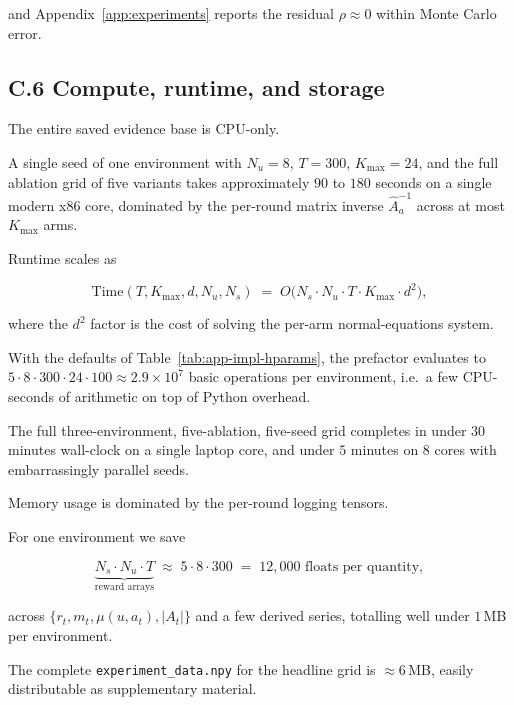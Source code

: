 \documentclass{article} %
\begin{document}
and Appendix~\ref{app:experiments} reports the residual $\rho \approx 0$ within Monte Carlo error.

\subsection{C.6 Compute, runtime, and storage}

\label{app:impl-compute}

The entire saved evidence base is CPU-only.

A single seed of one environment with $N_u = 8$, $T = 300$, $K_{\max} = 24$, and the full ablation grid of five variants takes approximately $90$ to $180$ seconds on a single modern x86 core, dominated by the per-round matrix inverse $\widehat{A}_a^{-1}$ across at most $K_{\max}$ arms.

Runtime scales as

\begin{equation}
\label{eq:app-impl-runtime}
\mathrm{Time}(T, K_{\max}, d, N_u, N_s) \;=\; O\big(N_s \cdot N_u \cdot T \cdot K_{\max} \cdot d^2\big),
\end{equation}

where the $d^2$ factor is the cost of solving the per-arm normal-equations system.

With the defaults of Table~\ref{tab:app-impl-hparams}, the prefactor evaluates to $5 \cdot 8 \cdot 300 \cdot 24 \cdot 100 \approx 2.9 \times 10^7$ basic operations per environment, i.e.\ a few CPU-seconds of arithmetic on top of Python overhead.

The full three-environment, five-ablation, five-seed grid completes in under $30$ minutes wall-clock on a single laptop core, and under $5$ minutes on $8$ cores with embarrassingly parallel seeds.

Memory usage is dominated by the per-round logging tensors.

For one environment we save

\begin{equation}
\label{eq:app-impl-storage}
\underbrace{N_s \cdot N_u \cdot T}_{\text{reward arrays}} \;\approx\; 5 \cdot 8 \cdot 300 \;=\; 12{,}000 \text{ floats per quantity},
\end{equation}

across $\{r_t, m_t, \mu(u,a_t), |A_t|\}$ and a few derived series, totalling well under $1$\,MB per environment.

The complete \texttt{experiment\_data.npy} for the headline grid is $\approx 6$\,MB, easily distributable as supplementary material.
\end{document}

